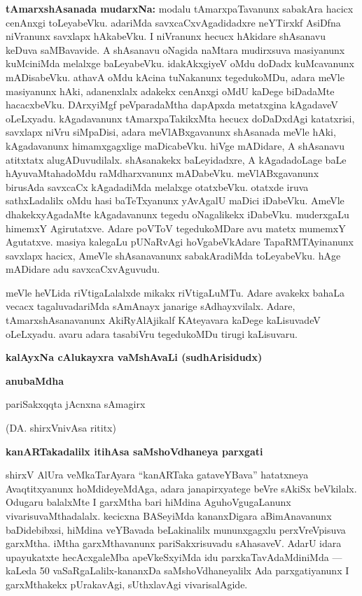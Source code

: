 \documentclass[11pt,a4size]{article}
\begin{document}
\medskip
\textbf{\Large tAmarxshAsanada mudarxNa:}
modalu tAmarxpaTavanunx sabakAra hacicx cenAnxgi toLeyabeVku. adariMda
savxcaCxvAgadidadxre neYTirxkf AsiDfna niVranunx savxlapx hAkabeVku. I
niVranunx hecucx hAkidare shAsanavu keDuva saMBavavide. A shAsanavu
oNagida naMtara mudirxsuva masiyanunx kuMciniMda melalxge
baLeyabeVku. idakAkxgiyeV oMdu doDadx kuMcavanunx mADisabeVku. athavA
oMdu kAcina tuNakanunx tegedukoMDu, adara meVle masiyanunx hAki,
adanenxlalx adakekx cenAnxgi oMdU kaDege biDadaMte
hacacxbeVku. DArxyiMgf peVparadaMtha dapApxda metatxgina kAgadaveV
oLeLxyadu. kAgadavanunx tAmarxpaTakikxMta hecucx doDaDxdAgi
katatxrisi, savxlapx niVru siMpaDisi, adara meVlABxgavanunx shAsanada
meVle hAki, kAgadavanunx himamxgagxlige maDicabeVku. hiVge mADidare, A
shAsanavu atitxtatx alugADuvudilalx. shAsanakekx baLeyidadxre, A
kAgadadoLage baLe hAyuvaMtahadoMdu raMdharxvanunx
mADabeVku. meVlABxgavanunx birusAda savxcaCx kAgadadiMda melalxge
otatxbeVku. otatxde iruva sathxLadalilx oMdu hasi baTeTxyanunx
yAvAgalU maDici iDabeVku. AmeVle dhakekxyAgadaMte kAgadavanunx tegedu
oNagalikekx iDabeVku. muderxgaLu himemxY Agirutatxve. Adare poVToV
tegedukoMDare avu matetx mumemxY Agutatxve. masiya kalegaLu pUNaRvAgi
hoVgabeVkAdare TapaRMTAyinanunx savxlapx hacicx, AmeVle shAsanavanunx
sabakAradiMda toLeyabeVku. hAge mADidare adu savxcaCxvAguvudu.

meVle heVLida riVtigaLalalxde mikakx riVtigaLuMTu. Adare avakekx
bahaLa vecacx tagaluvadariMda sAmAnayx janarige sAdhayxvilalx. Adare,
tAmarxshAsanavanunx AkiRyAlAjikalf KAteyavara kaDege kaLisuvadeV
oLeLxyadu. avaru adara tasabiVru tegedukoMDu tirugi kaLisuvaru.

\bigskip
\centerline{\textbf{\huge kalAyxNa cAlukayxra vaMshAvaLi
    (sudhArisidudx)}}
\bigskip


\bigskip
\noindent
\textbf{\Large anubaMdha}

\medskip
\begin{center}
{\Huge pariSakxqqta jAcnxna sAmagirx}

\Large{(DA. shirxVnivAsa rititx)}

\medskip
\textbf{\LARGE kanARTakadalilx itihAsa saMshoVdhaneya parxgati}
\end{center}
   
shirxV AlUra veMkaTarAyara ``kanARTaka gataveYBava'' hatatxneya
Avaqtitxyanunx hoMdideyeMdAga, adara janapirxyatege beVre sAkiSx
beVkilalx. Odugaru balalxMte I garxMtha bari hiMdina AguhoVgugaLanunx
vivarisuvaMthadalalx. kecicxna BASeyiMda kananxDigara aBimAnavanunx
baDidebibxsi, hiMdina veYBavada beLakinalilx mununxgagxlu
perxVreVpisuva garxMtha. iMtha garxMthavanunx pariSakxrisuvadu
sAhasaveV. AdarU idara upayukatxte hecAcxgaleMba apeVkeSxyiMda idu
parxkaTavAdaMdiniMda --- kaLeda 50 vaSaRgaLalilx-kananxDa
saMshoVdhaneyalilx Ada parxgatiyanunx I garxMthakekx pUrakavAgi,
sUthxlavAgi vivarisalAgide.
\end{document}
